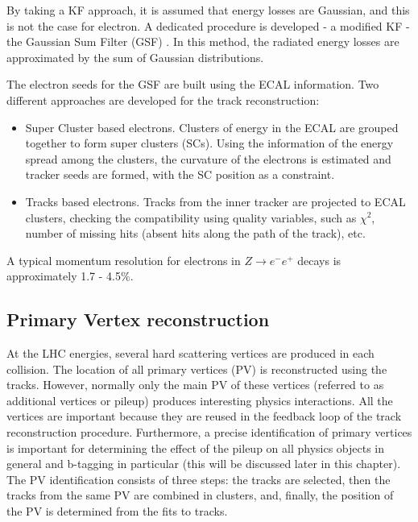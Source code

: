 By taking a KF approach, it is assumed that energy losses are Gaussian, and this is not the case for electron. A dedicated procedure is developed - a modified KF - the Gaussian Sum Filter (GSF) \cite{GSF}. In this method, the radiated energy losses are approximated by the sum of Gaussian distributions. 

The electron seeds for the GSF are built using the ECAL information. Two different approaches are developed for the track reconstruction:

\begin{itemize}

\item Super Cluster based electrons. Clusters of energy in the ECAL are grouped together to form super clusters (SCs). Using the information of the energy spread among the clusters, the curvature of the electrons is estimated and tracker seeds are formed, with the SC position as a constraint. 
\item Tracks based electrons. Tracks from the inner tracker are projected to ECAL clusters, checking the compatibility using quality variables, such as $\chi^2$, number of missing hits (absent hits along the path of the track), etc. 
\end{itemize}

A typical momentum resolution for electrons in $Z \rightarrow e^- e^+$ decays is approximately 1.7 - 4.5$\%$.

\subsection{Primary Vertex reconstruction}\label{sec:PV_reconstruction}

At the LHC energies, several hard scattering vertices are produced in each collision. The location of all primary vertices (PV) is reconstructed using the tracks. However, normally only the main PV of these vertices (referred to as additional vertices or pileup) produces interesting physics interactions. All the vertices are important because they are reused in the feedback loop of the track reconstruction procedure. Furthermore, a precise identification of primary vertices is important for determining the effect of the pileup on all physics objects in general and b-tagging in particular (this will be discussed later in this chapter). The PV identification consists of three steps: the tracks are selected, then the tracks from the same PV are combined in clusters, and, finally, the position of the PV is determined from the fits to tracks. 

